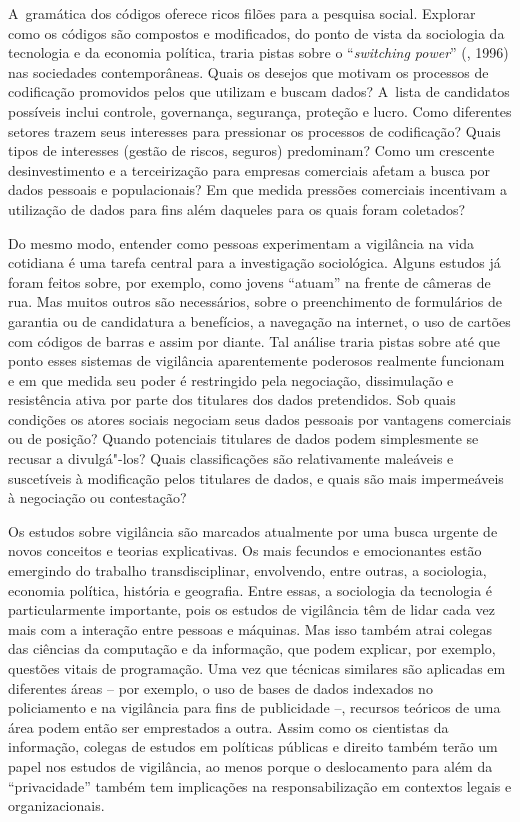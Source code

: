 A~gramática dos códigos oferece ricos filões para a pesquisa social.
Explorar como os códigos são compostos e modificados, do ponto de vista
da sociologia da tecnologia e da economia política, traria pistas sobre
o ``\emph{switching power}'' (, 1996) nas sociedades
contemporâneas. Quais os desejos que motivam os processos de codificação
promovidos pelos que utilizam e buscam dados? A~lista de candidatos
possíveis inclui controle, governança, segurança, proteção e lucro. Como
diferentes setores trazem seus interesses para pressionar os processos
de codificação? Quais tipos de interesses (gestão de riscos, seguros)
predominam? Como um crescente desinvestimento e a terceirização para
empresas comerciais afetam a busca por dados pessoais e populacionais?
Em que medida pressões comerciais incentivam a utilização de dados para
fins além daqueles para os quais foram coletados?

Do mesmo modo, entender como pessoas experimentam a vigilância na vida
cotidiana é uma tarefa central para a investigação sociológica. Alguns
estudos já foram feitos sobre, por exemplo, como jovens ``atuam'' na
frente de câmeras de rua. Mas muitos outros são necessários, sobre o
preenchimento de formulários de garantia ou de candidatura a benefícios,
a navegação na internet, o uso de cartões com códigos de barras e assim
por diante. Tal análise traria pistas sobre até que ponto esses sistemas
de vigilância aparentemente poderosos realmente funcionam e em que
medida seu poder é restringido pela negociação, dissimulação e
resistência ativa por parte dos titulares dos dados pretendidos. Sob
quais condições os atores sociais negociam seus dados pessoais por
vantagens comerciais ou de posição? Quando potenciais titulares de dados
podem simplesmente se recusar a divulgá"-los? Quais classificações são
relativamente maleáveis e suscetíveis à modificação pelos titulares de
dados, e quais são mais impermeáveis à negociação ou contestação?

Os estudos sobre vigilância são marcados atualmente por uma busca
urgente de novos conceitos e teorias explicativas. Os mais fecundos e
emocionantes estão emergindo do trabalho transdisciplinar, envolvendo,
entre outras, a sociologia, economia política, história e geografia.
Entre essas, a sociologia da tecnologia é particularmente importante,
pois os estudos de vigilância têm de lidar cada vez mais com a interação
entre pessoas e máquinas. Mas isso também atrai colegas das ciências da
computação e da informação, que podem explicar, por exemplo, questões
vitais de programação. Uma vez que técnicas similares são aplicadas em
diferentes áreas -- por exemplo, o uso de bases de dados indexados no
policiamento e na vigilância para fins de publicidade --, recursos
teóricos de uma área podem então ser emprestados a outra. Assim como os
cientistas da informação, colegas de estudos em políticas públicas e
direito também terão um papel nos estudos de vigilância, ao menos porque
o deslocamento para além da ``privacidade'' também tem implicações na
responsabilização em contextos legais e organizacionais.

